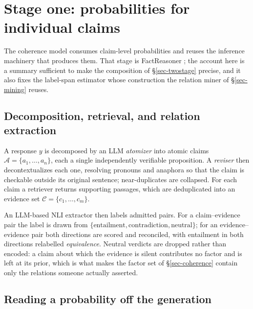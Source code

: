\section{Stage one: probabilities for individual claims}
\label{app-stage1}

The coherence model consumes claim-level probabilities and reuses the inference machinery that
produces them. That stage is FactReasoner \citep{factreasoner}; the account here is a summary
sufficient to make the composition of \S\ref{sec-twostage} precise, and it also fixes the
label-span estimator whose construction the relation miner of \S\ref{sec-mining} reuses.


\label{sec-factuality}\label{sec-examples}



\subsection{Decomposition, retrieval, and relation extraction}

A response $y$ is decomposed by an LLM \emph{atomizer} into atomic claims
$\mathcal{A}=\{a_1,\dots,a_n\}$, each a single independently verifiable proposition. A
\emph{reviser} then decontextualizes each one, resolving pronouns and anaphora so that the claim
is checkable outside its original sentence; near-duplicates are collapsed. For each claim a
retriever returns supporting passages, which are deduplicated into an evidence set
$\mathcal{C}=\{c_1,\dots,c_m\}$.

An LLM-based NLI extractor then labels admitted pairs. For a claim--evidence pair the label is
drawn from $\{\text{entailment},\text{contradiction},\text{neutral}\}$; for an evidence--evidence
pair both directions are scored and reconciled, with entailment in both directions relabelled
\emph{equivalence}. Neutral verdicts are dropped rather than encoded: a claim about which the
evidence is silent contributes no factor and is left at its prior, which is what makes the factor
set of \S\ref{sec-coherence} contain only the relations someone actually asserted.

\subsection{Reading a probability off the generation}
\label{sec-pstar}

